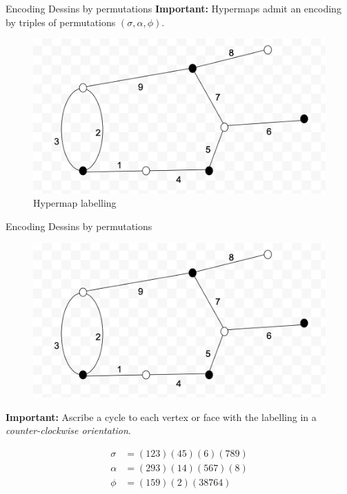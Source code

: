 \documentclass{beamer}
\begin{document}
\begin{frame}{Encoding Dessins by permutations}
    \textbf{Important:} Hypermaps admit an encoding by triples of permutations $(\sigma,\alpha,\phi)$.
    \begin{figure}
        \centering
        \includegraphics[scale=0.5]{images_talk/hypermap_permutations_encoding.png}
        \caption{\small{Hypermap labelling}}
    \end{figure}
\end{frame}

\begin{frame}{Encoding Dessins by permutations}
    \begin{figure}
        \centering
        \includegraphics[scale=0.4]{images_talk/hypermap_permutations_encoding.png}
    \end{figure}
    
    \textbf{Important:} Ascribe a cycle to each vertex or face with the labelling in a \emph{counter-clockwise orientation}.
    
    \begin{align*}
        \sigma &= (123)(45)(6)(789)\\
        \alpha &= (293)(14)(567)(8)\\
        \phi &= (159)(2)(38764)\\
    \end{align*}
\end{frame}
\end{document}
